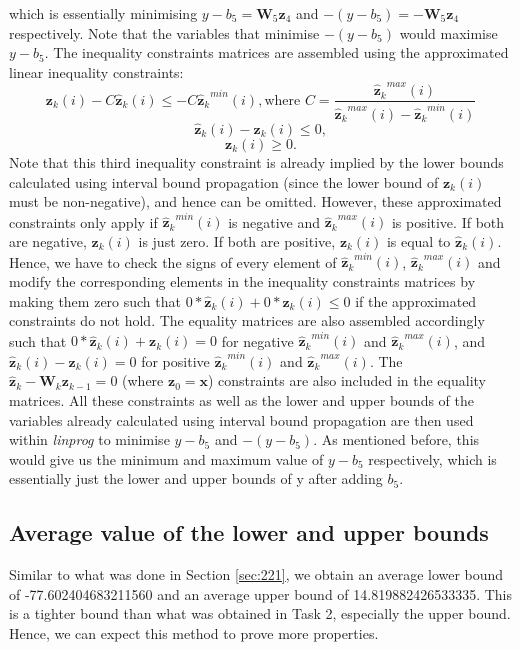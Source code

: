 \documentclass[11pt]{article}
\begin{document}
which is essentially minimising $y-b_5=\textbf{W}_{5}\textbf{z}_{4}$ and $-(y-b_5)=-\textbf{W}_{5}\textbf{z}_{4}$ respectively. Note that the variables that minimise $-(y-b_5)$ would maximise $y-b_5$. The inequality constraints matrices are assembled using the approximated linear inequality constraints:
\[
\textbf{z}_{k}(i) - C \hat{ \textbf{z}}_{k}(i) \leq -C {\hat{\textbf{z}}_k}^{min}(i), \text{where }C = \frac{{\hat{\textbf{z}}_k}^{max}(i)}{{\hat{\textbf{z}}_k}^{max}(i)-{\hat{\textbf{z}}_k}^{min}(i)}
\]
\[
\hat{ \textbf{z}}_{k}(i) - \textbf{z}_{k}(i) \leq 0,
\]
\[
\textbf{z}_{k}(i) \geq 0.
\]
Note that this third inequality constraint is already implied by the lower bounds calculated using interval bound propagation (since the lower bound of $\textbf{z}_{k}(i)$ must be non-negative), and hence can be omitted. However, these approximated constraints only apply if ${\hat{\textbf{z}}_k}^{min}(i)$ is negative and ${\hat{\textbf{z}}_k}^{max}(i)$ is positive. If both are negative, ${\textbf{z}_k}(i)$ is just zero. If both are positive, ${\textbf{z}_k}(i)$ is equal to ${\hat{\textbf{z}}_k}(i)$. Hence, we have to check the signs of every element of ${\hat{\textbf{z}}_k}^{min}(i)$, ${\hat{\textbf{z}}_k}^{max}(i)$ and modify the corresponding elements in the inequality constraints matrices by making them zero such that $0*{\hat{\textbf{z}}_k}(i) + 0*{\textbf{z}_k}(i) \leq 0$ if the approximated constraints do not hold. The equality matrices are also assembled accordingly such that $0*{\hat{\textbf{z}}_k}(i) + {\textbf{z}_k}(i) = 0$ for negative ${\hat{\textbf{z}}_k}^{min}(i)$ and ${\hat{\textbf{z}}_k}^{max}(i)$, and ${\hat{\textbf{z}}_k}(i) - {\textbf{z}_k}(i) = 0$ for positive ${\hat{\textbf{z}}_k}^{min}(i)$ and ${\hat{\textbf{z}}_k}^{max}(i)$. The $\hat{ \textbf{z}}_{k} - \textbf{W}_{k} \textbf{z}_{k-1} = 0$ (where $\textbf{z}_{0} = \textbf{x}$) constraints are also included in the equality matrices. All these constraints as well as the lower and upper bounds of the variables already calculated using interval bound propagation are then used within \emph{linprog} to minimise $y-b_5$ and $-(y-b_5)$. As mentioned before, this would give us the minimum and maximum value of $y-b_5$ respectively, which is essentially just the lower and upper bounds of y after adding $b_5$.

\subsection{Average value of the lower and upper bounds}
Similar to what was done in Section \ref{sec:221}, we obtain an average lower bound of -77.602404683211560 and an average upper bound of 14.819882426533335. This is a tighter bound than what was obtained in Task 2, especially the upper bound. Hence, we can expect this method to prove more properties.
\end{document}
